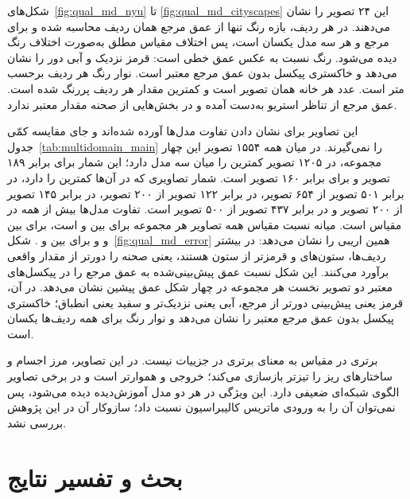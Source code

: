 شکل‌های~\ref{fig:qual_md_nyu} تا \ref{fig:qual_md_cityscapes} این ۲۴ تصویر را نشان می‌دهند. در هر ردیف، بازه رنگ تنها از عمق مرجع همان ردیف محاسبه شده و برای مرجع و هر سه مدل یکسان است، پس اختلاف مقیاس مطلق به‌صورت اختلاف رنگ دیده می‌شود. رنگ نسبت به عکس عمق خطی است: قرمز نزدیک و آبی دور را نشان می‌دهد و خاکستری پیکسل بدون عمق مرجع معتبر است. نوار رنگ هر ردیف برحسب متر است. عدد هر خانه  همان تصویر است و کمترین مقدار هر ردیف پررنگ شده است. عمق مرجع  از تناظر استریو به‌دست آمده و در بخش‌هایی از صحنه مقدار معتبر ندارد.

این تصاویر برای نشان دادن تفاوت مدل‌ها آورده شده‌اند و جای مقایسه کمّی جدول~\ref{tab:multidomain_main} را نمی‌گیرند. در میان همه ۱۵۵۴ تصویر این چهار مجموعه، \proposedmodel{} در ۱۲۰۵ تصویر کمترین  را میان سه مدل دارد؛ این شمار برای \controlmodel{} برابر ۱۸۹ تصویر و برای \publishedbasemodel{} برابر ۱۶۰ تصویر است. شمار تصاویری که \proposedmodel{} در آن‌ها کمترین  را دارد، در  برابر ۵۰۱ تصویر از ۶۵۴ تصویر، در  برابر ۱۲۲ تصویر از ۲۰۰ تصویر، در  برابر ۱۴۵ تصویر از ۲۰۰ تصویر و در  برابر ۴۳۷ تصویر از ۵۰۰ تصویر است. تفاوت مدل‌ها بیش از همه در مقیاس است. میانه نسبت مقیاس همه تصاویر هر مجموعه برای \proposedmodel{} بین  و  است، برای \controlmodel{} بین  و  و برای \publishedbasemodel{} بین  و . شکل~\ref{fig:qual_md_error} همین اریبی را نشان می‌دهد: در بیشتر ردیف‌ها، ستون‌های \publishedbasemodel{} و \controlmodel{} قرمزتر از ستون \proposedmodel{} هستند، یعنی صحنه را دورتر از مقدار واقعی برآورد می‌کنند. این شکل نسبت عمق پیش‌بینی‌شده به عمق مرجع را در پیکسل‌های معتبر دو تصویر نخست هر مجموعه در چهار شکل عمق پیشین نشان می‌دهد. در آن، قرمز یعنی پیش‌بینی دورتر از مرجع، آبی یعنی نزدیک‌تر و سفید یعنی انطباق؛ خاکستری پیکسل بدون عمق مرجع معتبر را نشان می‌دهد و نوار رنگ برای همه ردیف‌ها یکسان است.

برتری در مقیاس به معنای برتری در جزییات نیست. در این تصاویر، \publishedbasemodel{} مرز اجسام و ساختارهای ریز را تیزتر بازسازی می‌کند؛ خروجی \proposedmodel{} و \controlmodel{} هموارتر است و در برخی تصاویر الگوی شبکه‌ای ضعیفی دارد. این ویژگی در هر دو مدل آموزش‌دیده دیده می‌شود، پس نمی‌توان آن را به ورودی ماتریس کالیبراسیون نسبت داد؛ سازوکار آن در این پژوهش بررسی نشد.



\section{بحث و تفسیر نتایج}
\label{sec:discussion}

